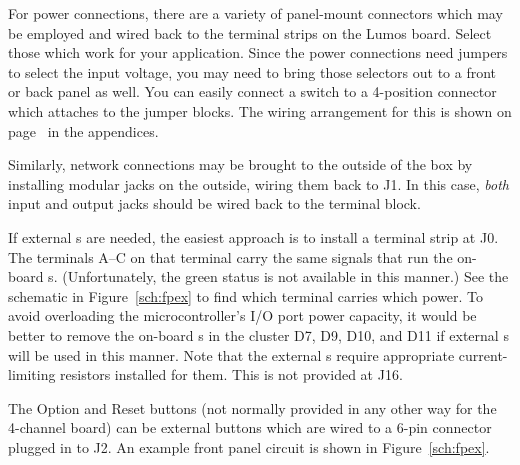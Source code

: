 \documentclass[letterpaper,twoside,onecolumn,openright,final]{memoir}
\begin{document}
For power connections, there are a variety of panel-mount connectors which may be employed and wired
back to the terminal strips on the Lumos board.  Select those which work for your application.
Since the power connections need jumpers to select the input voltage, you may need to bring those
selectors out to a front or back panel as well.  You can easily connect a  switch
to a 4-position connector which attaches to the jumper blocks.  The wiring arrangement for this 
is shown on page~\pageref{sec:voltagesw} in the appendices.

Similarly, network connections may be brought to the outside of the box by installing modular jacks
on the outside, wiring them back to J1.  In this case, \emph{both} input and output jacks should be wired
back to the terminal block.

If external s are needed, the easiest approach is to install a terminal strip at J0.
The terminals A--C on that terminal carry the same signals that run the on-board s.
(Unfortunately, the green status  is not available in this manner.)
See the schematic in Figure~\ref{sch:fpex}
to find which terminal carries which  power.
To avoid overloading the microcontroller's I/O port power capacity, it would be better to remove the
on-board s in the cluster D7, D9, D10, and D11 if external s will be used
in this manner.  Note that the external s require appropriate current-limiting resistors
installed for them.  This is not provided at J16.

The Option and Reset buttons (not normally provided in any other way for the 4-channel board) 
can be external buttons which are wired to a 6-pin connector 
plugged in to J2.  An example front panel circuit is shown in Figure~\ref{sch:fpex}.
\end{document}
